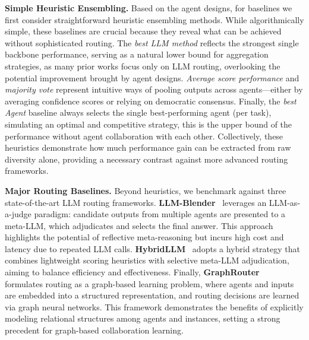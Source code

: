 \documentclass[11pt]{article}
\begin{document}
\noindent\textbf{Simple Heuristic Ensembling. } 
Based on the agent designs, for baselines we first consider straightforward heuristic ensembling methods. While algorithmically simple, these baselines are crucial because they reveal what can be achieved without sophisticated routing. The \textit{best LLM method} reflects the strongest single backbone performance, serving as a natural lower bound for aggregation strategies, as many prior works focus only on LLM routing, overlooking the potential improvement brought by agent designs. \textit{Average score performance} and \textit{majority vote} represent intuitive ways of pooling outputs across agents---either by averaging confidence scores or relying on democratic consensus. Finally, the \textit{best Agent} baseline always selects the single best-performing agent (per task), simulating an optimal and competitive strategy, this is the upper bound of the performance without agent collaboration with each other. Collectively, these heuristics demonstrate how much performance gain can be extracted from raw diversity alone, providing a necessary contrast against more advanced routing frameworks.  



\noindent\textbf{Major Routing Baselines. } 
Beyond heuristics, we benchmark against three state-of-the-art LLM routing frameworks. \textbf{LLM-Blender}~\citep{jiang2023llm} leverages an LLM-as-a-judge paradigm: candidate outputs from multiple agents are presented to a meta-LLM, which adjudicates and selects the final answer. This approach highlights the potential of reflective meta-reasoning but incurs high cost and latency due to repeated LLM calls. \textbf{HybridLLM}~\citep{ding2024hybridllm} adopts a hybrid strategy that combines lightweight scoring heuristics with selective meta-LLM adjudication, aiming to balance efficiency and effectiveness. Finally, \textbf{GraphRouter}~\citep{feng2024graphrouter} formulates routing as a graph-based learning problem, where agents and inputs are embedded into a structured representation, and routing decisions are learned via graph neural networks. This framework demonstrates the benefits of explicitly modeling relational structures among agents and instances, setting a strong precedent for graph-based collaboration learning.
\end{document}
